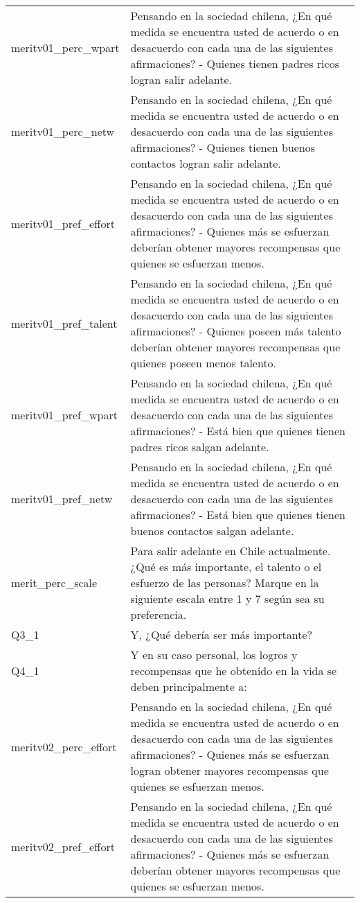 \documentclass[
  10,
  landscape,
  legalpaper]{article}
\begin{document}
\begin{table}
{\begin{tabular}{l>{\raggedright\arraybackslash}p{10cm}}
meritv01\_perc\_wpart & Pensando en la sociedad chilena, ¿En qué medida se encuentra usted de acuerdo o en desacuerdo con cada una de las siguientes afirmaciones? - Quienes tienen padres ricos logran salir adelante.\\
\addlinespace
meritv01\_perc\_netw & Pensando en la sociedad chilena, ¿En qué medida se encuentra usted de acuerdo o en desacuerdo con cada una de las siguientes afirmaciones? - Quienes tienen buenos contactos logran salir adelante.\\
meritv01\_pref\_effort & Pensando en la sociedad chilena, ¿En qué medida se encuentra usted de acuerdo o en desacuerdo con cada una de las siguientes afirmaciones? - Quienes más se esfuerzan deberían obtener mayores recompensas que quienes se esfuerzan menos.\\
meritv01\_pref\_talent & Pensando en la sociedad chilena, ¿En qué medida se encuentra usted de acuerdo o en desacuerdo con cada una de las siguientes afirmaciones? - Quienes poseen más talento deberían obtener mayores recompensas que quienes poseen menos talento.\\
meritv01\_pref\_wpart & Pensando en la sociedad chilena, ¿En qué medida se encuentra usted de acuerdo o en desacuerdo con cada una de las siguientes afirmaciones? - Está bien que quienes tienen padres ricos salgan adelante.\\
meritv01\_pref\_netw & Pensando en la sociedad chilena, ¿En qué medida se encuentra usted de acuerdo o en desacuerdo con cada una de las siguientes afirmaciones? - Está bien que quienes tienen buenos contactos salgan adelante.\\
\addlinespace
merit\_perc\_scale & Para salir adelante en Chile actualmente. ¿Qué es más importante, el talento o el esfuerzo de las personas? Marque en la siguiente escala entre 1 y 7 según sea su preferencia.\\
Q3\_1 & Y, ¿Qué debería ser más importante?\\
Q4\_1 & Y en su caso personal, los logros y recompensas que he obtenido en la vida se deben principalmente a:\\
meritv02\_perc\_effort & Pensando en la sociedad chilena, ¿En qué medida se encuentra usted de acuerdo o en desacuerdo con cada una de las siguientes afirmaciones? - Quienes más se esfuerzan logran obtener mayores recompensas que quienes se esfuerzan menos.\\
meritv02\_pref\_effort & Pensando en la sociedad chilena, ¿En qué medida se encuentra usted de acuerdo o en desacuerdo con cada una de las siguientes afirmaciones? - Quienes más se esfuerzan deberían obtener mayores recompensas que quienes se esfuerzan menos.\\

\end{tabular}}
\end{table}
\end{document}
